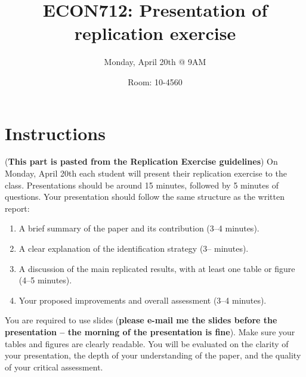 \documentclass[letterpaper,12pt]{article}
\title{\vspace{-.5in} ECON712: Presentation of  replication exercise}
\author{Monday, April 20th @ 9AM}
\date{Room: 10-4560}
\begin{document}

\maketitle
\vspace{-.3in}

\section*{Instructions}

(\textbf{This part is pasted from the Replication Exercise guidelines}) On Monday, April 20th each student will present their replication exercise to the class. Presentations should be around 15 minutes, followed by 5 minutes of questions. Your presentation should follow the same structure as the written report:

\begin{enumerate}
    \item A brief summary of the paper and its contribution (3--4 minutes).
    \item A clear explanation of the identification strategy (3-- minutes).
    \item A discussion of the main replicated results, with at least one table or figure (4--5 minutes).
    \item Your proposed improvements and overall assessment (3--4 minutes).
\end{enumerate}

\noindent You are required to use slides (\textbf{please e-mail me the slides before the presentation -- the morning of the presentation is fine}). Make sure your tables and figures are clearly readable. You will be evaluated on the clarity of your presentation, the depth of your understanding of the paper, and the quality of your critical assessment.
\end{document}
